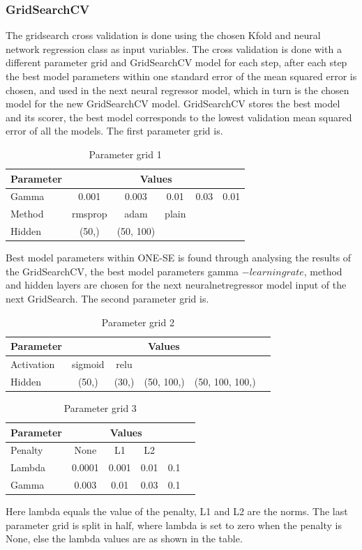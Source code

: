 \subsubsection{GridSearchCV}
The gridsearch cross validation is done using the chosen Kfold and neural network regression class
as input variables. The cross validation is done with a different parameter
grid and GridSearchCV model for each step, after each step the best model parameters within one standard error
of the mean squared error is chosen, and used in the next neural regressor model, which in turn is 
the chosen model for the new GridSearchCV model.  
GridSearchCV stores the best model and its scorer, the best model corresponds to the lowest validation mean squared error of all the models.
The first parameter grid is. 
\begin{table}[htbp]
    \centering
    \caption{Parameter grid 1}
    \label{tab:ParamGrid1}
    \begin{tabular}{lccccc}
        \hline
        Parameter & \multicolumn{5}{c}{Values}\\
        \hline
        Gamma  & 0.001 & 0.003 & 0.01  & 0.03  & 0.01  \\
        Method & rmsprop & adam    & plain   \\
        Hidden & (50,)    & (50, 100)\\
        \hline
    \end{tabular}
\end{table}
Best model parameters within ONE-SE is found through analysing the results of the GridSearchCV,
the best model parameters gamma $- learning rate$, method and hidden layers are chosen for the next
neuralnetregressor model input of the next GridSearch. The second parameter grid is.  
\begin{table}[htbp]
    \centering
    \caption{Parameter grid 2}
    \label{tab:ParamGrid2}
    \begin{tabular}{lccccc}
        \hline
        Parameter & \multicolumn{4}{c}{Values}\\
        \hline
        Activation  & sigmoid & relu\\
        Hidden & (50,) & (30,) & (50, 100,) & (50, 100, 100,) \\
        \hline
    \end{tabular}
\end{table}
\begin{table}[htbp]
    \centering
    \caption{Parameter grid 3}
    \label{tab:ParamGrid3}
    \begin{tabular}{lccccc}
        \hline
        Parameter & \multicolumn{4}{c}{Values}\\
        \hline
        Penalty  & None   & L1    & L2 \\
        Lambda   & 0.0001 & 0.001 & 0.01 & 0.1 \\
        Gamma    & 0.003  & 0.01  & 0.03 & 0.1 \\
        \hline
    \end{tabular}
\end{table}
Here lambda equals the value of the penalty, L1 and L2 are the norms. 
The last parameter grid is split in half, where lambda is set to zero 
when the penalty is None, else the lambda values are as shown in the table.

